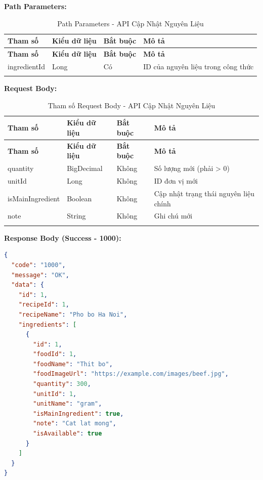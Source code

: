 \textbf{Path Parameters:}

\small
\begin{longtable}{|>{\raggedright\arraybackslash}p{3cm}|>{\raggedright\arraybackslash}p{2.5cm}|>{\raggedright\arraybackslash}p{2cm}|>{\raggedright\arraybackslash}p{6cm}|}
\hline
\textbf{Tham số} & \textbf{Kiểu dữ liệu} & \textbf{Bắt buộc} & \textbf{Mô tả} \\
\hline
\endfirsthead
\hline
\textbf{Tham số} & \textbf{Kiểu dữ liệu} & \textbf{Bắt buộc} & \textbf{Mô tả} \\
\hline
\endhead
ingredientId & Long & Có & ID của nguyên liệu trong công thức \\
\hline
\caption{Path Parameters - API Cập Nhật Nguyên Liệu}
\end{longtable}

\textbf{Request Body:}

\small
\begin{longtable}{|>{\raggedright\arraybackslash}p{3.5cm}|>{\raggedright\arraybackslash}p{2.5cm}|>{\raggedright\arraybackslash}p{2cm}|>{\raggedright\arraybackslash}p{5.5cm}|}
\hline
\textbf{Tham số} & \textbf{Kiểu dữ liệu} & \textbf{Bắt buộc} & \textbf{Mô tả} \\
\hline
\endfirsthead
\hline
\textbf{Tham số} & \textbf{Kiểu dữ liệu} & \textbf{Bắt buộc} & \textbf{Mô tả} \\
\hline
\endhead
quantity & BigDecimal & Không & Số lượng mới (phải > 0) \\
\hline
unitId & Long & Không & ID đơn vị mới \\
\hline
isMainIngredient & Boolean & Không & Cập nhật trạng thái nguyên liệu chính \\
\hline
note & String & Không & Ghi chú mới \\
\hline
\caption{Tham số Request Body - API Cập Nhật Nguyên Liệu}
\end{longtable}

\textbf{Response Body (Success - 1000):}

\begin{lstlisting}[language=json, caption=Response thanh cong API 4.7]
{
  "code": "1000",
  "message": "OK",
  "data": {
    "id": 1,
    "recipeId": 1,
    "recipeName": "Pho bo Ha Noi",
    "ingredients": [
      {
        "id": 1,
        "foodId": 1,
        "foodName": "Thit bo",
        "foodImageUrl": "https://example.com/images/beef.jpg",
        "quantity": 300,
        "unitId": 1,
        "unitName": "gram",
        "isMainIngredient": true,
        "note": "Cat lat mong",
        "isAvailable": true
      }
    ]
  }
}
\end{lstlisting}

